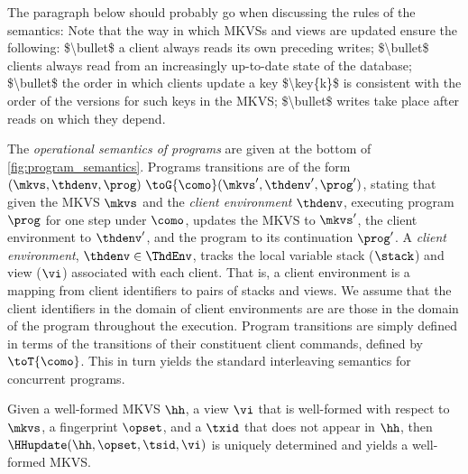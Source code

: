 \ac{The paragraph below should probably go when discussing the rules of the semantics:

Note that the way in which MKVSs and views are updated ensure the following: 
$\bullet$ a client always reads its own preceding writes; 
$\bullet$ clients always read from an increasingly up-to-date state of the database; 
$\bullet$ the order in which clients update a key $\key{k}$ is consistent with the 
order of the versions for such keys in the MKVS; 
$\bullet$ writes take place after reads on which they depend. 
}



The \emph{operational semantics of programs} are given at the bottom of \cref{fig:program_semantics}. 
Programs transitions are of the form $(\mkvs,  \thdenv, \prog) \ \toG{\como} (\mkvs',  \thdenv', \prog')$,
stating that given the MKVS $\mkvs$ and the \emph{client environment} $\thdenv$, executing program $\prog$ for one step under $\como$, updates the MKVS to $\mkvs'$, the client environment to $\thdenv'$, and the program to its continuation $\prog'$. 
A \emph{client environment}, $\thdenv \in \ThdEnv$, tracks the local variable stack ($\stack$) and view ($\vi$) associated with each client. 
That is, a client environment is a mapping from client identifiers to pairs of stacks and views. 
We assume that the client identifiers in the domain of client environments are are those in the domain of the program throughout the execution. 
Program transitions are simply defined in terms of the transitions of their constituent client commands, defined by $\toT{\como}$. 
This in turn yields the standard interleaving semantics for concurrent programs. 




\begin{lemma}
\label{lem:hhupdate.welldefined}
Given a well-formed MKVS $\hh$, a view $\vi$ that is well-formed with respect to \( \mkvs \), a fingerprint \( \opset \), and a $\txid$ that does not appear in $\hh$, then $\HHupdate(\hh, \opset, \tsid, \vi)$ is uniquely determined and yields a well-formed MKVS.
\end{lemma}

